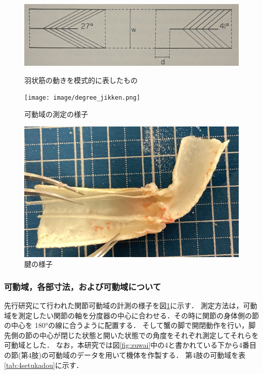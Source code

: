\begin{figure}[t]
  \begin{minipage}[b]{0.6\hsize}
    \centering
    \includegraphics[scale=0.18]{image/ujo.JPG}
    \vspace{5mm}
    \caption{羽状筋の動きを模式的に表したもの\cite{warner1977biology}}
    \label{fig:ujo}
  \end{minipage}
  \begin{minipage}[b]{0.39\hsize}
    \centering
    \texttt{[image: image/degree\_jikken.png]}
    \caption{可動域の測定の様子}
    \label{fig:sokutei}
  \end{minipage}
\end{figure}
\begin{figure}[t]
  \centering
  \includegraphics[scale=0.1]{image/setukanmaku.jpg}
  \caption{腱の様子\cite{hasegawa}}
  \label{fig:ken}
\end{figure}
\subsubsection{可動域，各部寸法，および可動域について}
先行研究\cite{hasegawa}にて行われた関節可動域の計測の様子を図\ref{fig:sokutei}に示す．
測定方法は，可動域を測定したい関節の軸を分度器の中心に合わせる．その時に関節の身体側の節の中心を 180°の線に合うように配置する．
そして蟹の脚で開閉動作を行い，脚先側の節の中心が閉じた状態と開いた状態での角度をそれぞれ測定してそれらを可動域とした．
なお，本研究では図\ref{fig:zuwai}中の4と書かれている下から4番目の節(第4肢)の可動域のデータを用いて機体を作製する．
第4肢の可動域を表\ref{tab:4setukadou}に示す．

